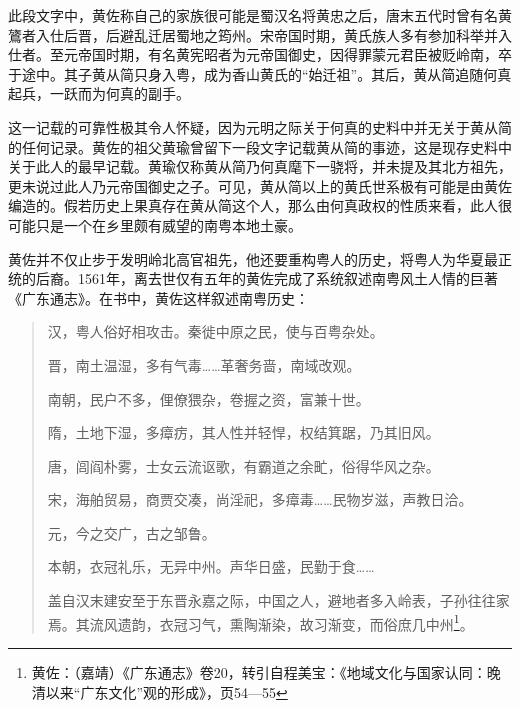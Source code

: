 此段文字中，黄佐称自己的家族很可能是蜀汉名将黄忠之后，唐末五代时曾有名黄鷟者入仕后晋，后避乱迁居蜀地之筠州。宋帝国时期，黄氏族人多有参加科举并入仕者。至元帝国时期，有名黄宪昭者为元帝国御史，因得罪蒙元君臣被贬岭南，卒于途中。其子黄从简只身入粤，成为香山黄氏的“始迁祖”。其后，黄从简追随何真起兵，一跃而为何真的副手。

这一记载的可靠性极其令人怀疑，因为元明之际关于何真的史料中并无关于黄从简的任何记录。黄佐的祖父黄瑜曾留下一段文字记载黄从简的事迹，这是现存史料中关于此人的最早记载。黄瑜仅称黄从简乃何真麾下一骁将，并未提及其北方祖先，更未说过此人乃元帝国御史之子。可见，黄从简以上的黄氏世系极有可能是由黄佐编造的。假若历史上果真存在黄从简这个人，那么由何真政权的性质来看，此人很可能只是一个在乡里颇有威望的南粤本地土豪。

黄佐并不仅止步于发明岭北高官祖先，他还要重构粤人的历史，将粤人为华夏最正统的后裔。1561年，离去世仅有五年的黄佐完成了系统叙述南粤风土人情的巨著《广东通志》。在书中，黄佐这样叙述南粤历史：

\begin{quote}

汉，粤人俗好相攻击。秦徙中原之民，使与百粤杂处。

晋，南土温湿，多有气毒……革奢务啬，南域改观。

南朝，民户不多，俚僚猥杂，卷握之资，富兼十世。

隋，土地下湿，多瘴疠，其人性并轻悍，权结箕踞，乃其旧风。

唐，闾阎朴雾，士女云流讴歌，有霸道之余甿，俗得华风之杂。

宋，海舶贸易，商贾交凑，尚淫祀，多瘴毒……民物岁滋，声教日洽。

元，今之交广，古之邹鲁。

本朝，衣冠礼乐，无异中州。声华日盛，民勤于食……

盖自汉末建安至于东晋永嘉之际，中国之人，避地者多入岭表，子孙往往家焉。其流风遗韵，衣冠习气，熏陶渐染，故习渐变，而俗庶几中州\footnote{黄佐：（嘉靖）《广东通志》卷20，转引自程美宝：《地域文化与国家认同：晚清以来“广东文化”观的形成》，页54—55}。

\end{quote}

